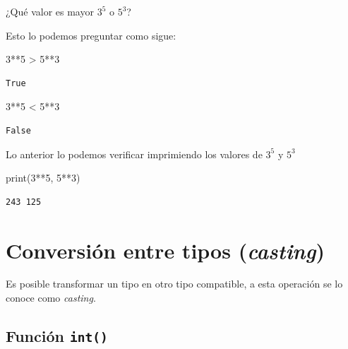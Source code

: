 \documentclass[
  spanish,
  letterpaper,
]{scrbook}
\newenvironment{Shaded}{\begin{snugshade}}{\end{snugshade}}
\newcommand{\BuiltInTok}[1]{\textcolor[rgb]{0.00,0.23,0.31}{#1}}
\newcommand{\DecValTok}[1]{\textcolor[rgb]{0.68,0.00,0.00}{#1}}
\newcommand{\NormalTok}[1]{\textcolor[rgb]{0.00,0.23,0.31}{#1}}
\newcommand{\OperatorTok}[1]{\textcolor[rgb]{0.37,0.37,0.37}{#1}}
\theoremstyle{definition}
\theoremstyle{remark}
\begin{document}
¿Qué valor es mayor \(3^5\) o \(5^3\)?

Esto lo podemos preguntar como sigue:

\begin{Shaded}
\begin{Highlighting}[]
\DecValTok{3}\OperatorTok{**}\DecValTok{5} \OperatorTok{\textgreater{}} \DecValTok{5}\OperatorTok{**}\DecValTok{3}
\end{Highlighting}
\end{Shaded}

\begin{verbatim}
True
\end{verbatim}

\begin{Shaded}
\begin{Highlighting}[]
\DecValTok{3}\OperatorTok{**}\DecValTok{5} \OperatorTok{\textless{}} \DecValTok{5}\OperatorTok{**}\DecValTok{3}
\end{Highlighting}
\end{Shaded}

\begin{verbatim}
False
\end{verbatim}

Lo anterior lo podemos verificar imprimiendo los valores de \(3^5\) y
\(5^3\)

\begin{Shaded}
\begin{Highlighting}[]
\BuiltInTok{print}\NormalTok{(}\DecValTok{3}\OperatorTok{**}\DecValTok{5}\NormalTok{, }\DecValTok{5}\OperatorTok{**}\DecValTok{3}\NormalTok{)}
\end{Highlighting}
\end{Shaded}

\begin{verbatim}
243 125
\end{verbatim}

\section{\texorpdfstring{Conversión entre tipos
(\emph{casting})}{Conversión entre tipos (casting)}}\label{conversiuxf3n-entre-tipos-casting}

Es posible transformar un tipo en otro tipo compatible, a esta operación
se lo conoce como \emph{casting}.

\subsection{\texorpdfstring{Función
\texttt{int()}}{Función int()}}\label{funciuxf3n-int}
\end{document}
